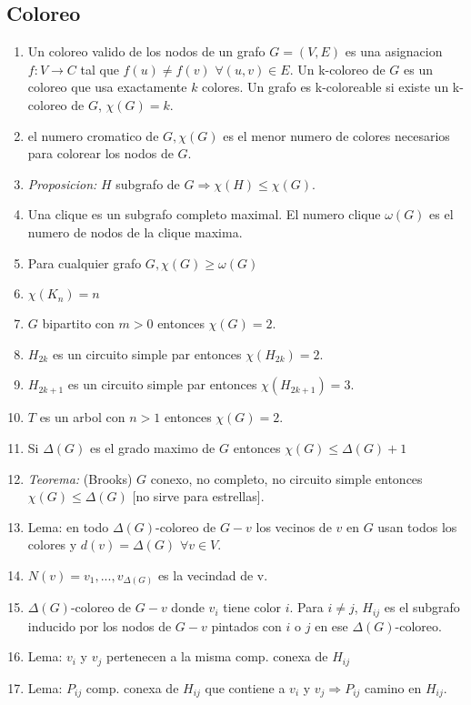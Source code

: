\documentclass[a4paper, 11pt]{article}
\begin{document}
\subsection{Coloreo}
\begin{enumerate}
\item Un coloreo valido de los nodos de un grafo $G=(V,E)$ es una asignacion $f:V\rightarrow C$ tal que $f(u) \neq f(v)$ $\forall(u,v)\in E$. Un k-coloreo de $G$ es un coloreo que usa exactamente $k$ colores. Un grafo es k-coloreable si existe un k-coloreo de $G$, $\chi(G)=k$.
\item el numero cromatico de $G, \chi(G)$ es el menor numero de colores necesarios para colorear los nodos de $G$.
\item \textit{Proposicion:} $H$ subgrafo de $G \Rightarrow \chi(H) \leq \chi(G)$.
\item Una clique es un subgrafo completo maximal. El numero clique $\omega(G)$ es el numero de nodos de la clique maxima.
\item Para cualquier grafo $G, \chi(G) \geq \omega(G)$
\item $\chi(K_{n}) = n$
\item $G$ bipartito con $m>0$ entonces $\chi(G) = 2$.
\item $H_{2k}$ es un circuito simple par entonces $\chi(H_{2k}) = 2$.
\item $H_{2k+1}$ es un circuito simple par entonces $\chi(H_{2k+1}) = 3$.
\item $T$ es un arbol con $n>1$ entonces $\chi(G) = 2$.
\item Si $\Delta(G)$ es el grado maximo de $G$ entonces $\chi(G) \leq \Delta(G)+1$
\item \textit{Teorema:} (Brooks) $G$ conexo, no completo, no circuito simple entonces $\chi(G) \leq \Delta(G)$ [no sirve para estrellas].
\item Lema: en todo $\Delta(G)$-coloreo de $G-{v}$ los vecinos de $v$ en $G$ usan todos los colores y $d(v) = \Delta(G)$ $\forall v \in V$.
\item $N(v)={v_{1},...,v_{\Delta(G)}}$ es la vecindad de v.
\item $\Delta(G)$-coloreo de $G-{v}$ donde $v_{i}$ tiene color $i$. Para $i \neq j$, $H_{ij}$ es el subgrafo inducido por los nodos de $G-{v}$ pintados con $i$ o $j$ en ese $\Delta(G)$-coloreo.
\item Lema: $v_{i}$ y $v_{j}$ pertenecen a la misma comp. conexa de $H_{ij}$
\item Lema: $P_{ij}$ comp. conexa de $H_{ij}$ que contiene a $v_{i}$ y $v_{j} \Rightarrow P_{ij}$ camino en $H_{ij}$.

\end{enumerate}
\end{document}
